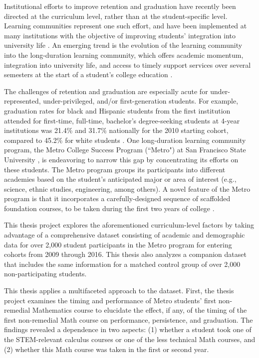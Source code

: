 Institutional efforts to improve retention and graduation have recently been directed at the curriculum level, rather than at the student-specific level.  Learning communities represent one such effort, and have been implemented at many institutions with the objective of improving students' integration into university life \cite{Tinto, Zhao}.  An emerging trend is the evolution of the learning community into the long-duration learning community, which offers academic momentum, integration into university life, and access to timely support services over several semesters at the start of a student's college education \cite{Kolenovic}.  

The challenges of retention and graduation are especially acute for under-represented, under-privileged, and/or first-generation students.  For example, graduation rates for black and Hispanic students from the first institution attended for first-time, full-time, bachelor's degree-seeking students at 4-year institutions was 21.4\% and 31.7\% nationally for the 2010 starting cohort, compared to 45.2\% for white students  \cite{NCES_grad}.  One long-duration learning community program, the Metro College Success Program (``Metro") at San Francisco State University \cite{Metro}, is endeavoring to narrow this gap by concentrating its efforts on these students.  The Metro program groups its participants into different academies based on the student's anticipated major or area of interest (e.g., science, ethnic studies, engineering, among others).  A novel feature of the Metro program is that it incorporates a carefully-designed sequence of scaffolded foundation courses, to be taken during the first two years of college \cite{Metro}.

This thesis project explores the aforementioned curriculum-level factors by taking advantage of a comprehensive dataset consisting of academic and demographic data for over 2,000 student participants in the Metro program for entering cohorts from 2009 through 2016.  This thesis also analyzes a companion dataset that includes the same information for a matched control group of over 2,000 non-participating students.

This thesis applies a multifaceted approach to the dataset.  First, the thesis project examines the timing and performance of Metro students' first non-remedial Mathematics course to elucidate the effect, if any, of the timing of the first non-remedial Math course on performance, persistence, and graduation. The findings revealed a dependence in two aspects: (1) whether a student took one of the STEM-relevant calculus courses or one of the less technical Math courses, and (2) whether this Math course was taken in the first or second year. 

